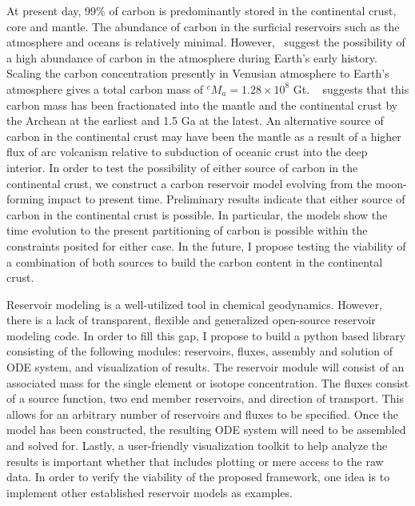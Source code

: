 At present day, 99\% of carbon is predominantly stored in the continental crust, core and mantle. The abundance of carbon in the surficial reservoirs such as the atmosphere and oceans is relatively minimal. However,~\citet{KJF-ATP:1986} suggest the possibility of a high abundance of carbon in the atmosphere during Earth's early history. Scaling the carbon concentration presently in Venusian atmosphere to Earth's atmosphere gives a total carbon mass of $^cM_{a} = 1.28 \times 10^8$ Gt. ~\citet{KJD:2002} suggests that this carbon mass has been fractionated into the mantle and the continental crust by the Archean at the earliest and 1.5 Ga at the latest. An alternative source of carbon in the continental crust may have been the mantle as a result of a higher flux of arc volcanism relative to subduction of oceanic crust into the deep interior. In order to test the possibility of either source of carbon in the continental crust, we construct a carbon reservoir model evolving from the moon-forming impact to present time. Preliminary results indicate that either source of carbon in the continental crust is possible. In particular, the models show the time evolution to the present partitioning of carbon is possible within the constraints posited for either case. In the future, I propose testing the viability of a combination of both sources to build the carbon content in the continental crust.

Reservoir modeling is a well-utilized tool in chemical geodynamics. However, there is a lack of transparent, flexible and generalized open-source reservoir modeling code. In order to fill this gap, I propose to build a python based library consisting of the following modules: reservoirs, fluxes, assembly and solution of ODE system, and visualization of results. The reservoir module will consist of an associated mass for the single element or isotope concentration. The fluxes consist of a source function, two end member reservoirs, and direction of transport. This allows for an arbitrary number of reservoirs and fluxes to be specified. Once the model has been constructed, the resulting ODE system will need to be assembled and solved for. Lastly, a user-friendly visualization toolkit to help analyze the results is important whether that includes plotting or mere access to the raw data. In order to verify the viability of the proposed framework, one idea is to implement other established reservoir models as examples.